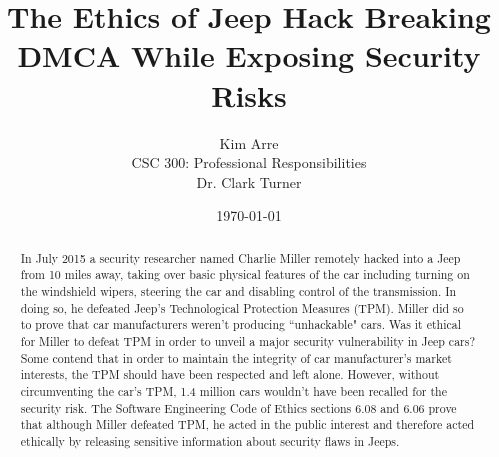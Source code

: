 \documentclass[12pt]{article}
\begin{document}

\title{\vfill The Ethics of Jeep Hack Breaking DMCA While Exposing Security Risks} %
\author{
  Kim Arre \vspace{10pt} \\
  CSC 300: Professional Responsibilities  \vspace{10pt} \\
  Dr. Clark Turner \vspace{10pt} \\
}
\date{\today}

\maketitle

\vfill  %
\begin{abstract}
In July 2015 a security researcher named Charlie Miller remotely hacked into a Jeep from 10 miles away, taking over basic physical features of the car including turning on the windshield wipers, steering the car and disabling control of the transmission.\cite{wired} In doing so, he defeated Jeep's Technological Protection Measures (TPM). Miller did so to prove that car manufacturers weren't producing ``unhackable" cars.\cite{youtube} Was it ethical for Miller to defeat TPM in order to unveil a major security vulnerability in Jeep cars? Some contend that in order to maintain the integrity of car manufacturer's market interests, the TPM should have been respected and left alone. However, without circumventing the car's TPM, 1.4 million cars wouldn't have been recalled for the security risk.\cite{recall} The Software Engineering Code of Ethics sections 6.08 and 6.06 prove that although Miller defeated TPM, he acted in the public interest and therefore acted ethically by releasing sensitive information about security flaws in Jeeps.\cite{peer}
\end{abstract}

\thispagestyle{empty} %
\newpage
\end{document}

